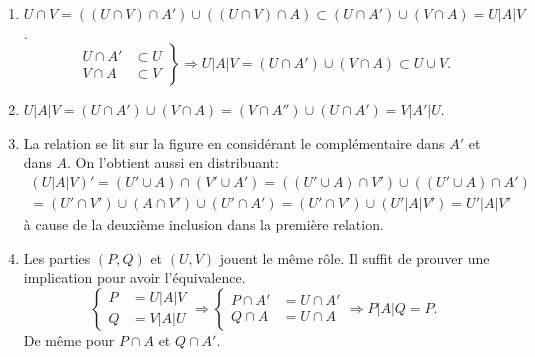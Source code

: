 \begin{demo}
\begin{enumerate}
 \item $U \cap V = \left((U \cap V)\cap A'\right) \cup \left((U \cap V)\cap A\right)
 \subset \left( U \cap A'\right) \cup \left(V \cap A \right) = U | A | V$.
 \begin{displaymath}
  \left.
   \begin{aligned}
    U \cap A' &\subset U \\
    V \cap A &\subset V
   \end{aligned}
   \right\rbrace
   \Rightarrow
   U | A | V = \left( U \cap A'\right) \cup \left(V \cap A \right) \subset U \cup V.
 \end{displaymath}

 \item $U | A | V = \left( U \cap A'\right) \cup \left(V \cap A \right)
 = \left(V \cap A'' \right) \cup \left( U \cap A'\right) = V | A' | U$.

 \item La relation se lit sur la figure en considérant le complémentaire dans $A'$ et dans $A$. On l'obtient aussi en distribuant:
 \begin{multline*}
   (U | A | V)' =  \left(U' \cup A\right) \cap \left(V' \cup A' \right)
     = \left(\left(U' \cup A\right) \cap V'\right) \cup \left(\left(U' \cup A\right) \cap A'\right)\\
     = \left(U' \cap V' \right) \cup \left(A \cap V' \right)  \cup \left(U' \cap A' \right)
     = \left(U' \cap V' \right) \cup \left(U' | A | V'\right) = U' | A | V'
 \end{multline*}
à cause de la deuxième inclusion dans la première relation.

 \item Les parties $(P,Q)$ et $(U,V)$ jouent le même rôle. Il suffit de prouver une implication pour avoir l'équivalence.
 \begin{displaymath}
  \left\lbrace
  \begin{aligned}
   P &= U | A | V \\
   Q &= V | A | U
  \end{aligned}
  \right.
  \Rightarrow
  \left\lbrace
  \begin{aligned}
    P \cap A' &= U \cap A' \\
    Q \cap A &= U \cap A
  \end{aligned}
  \right.
  \Rightarrow P | A | Q = P.
 \end{displaymath}
De même pour $P \cap A$ et $Q \cap A'$.
\end{enumerate}

\end{demo}
